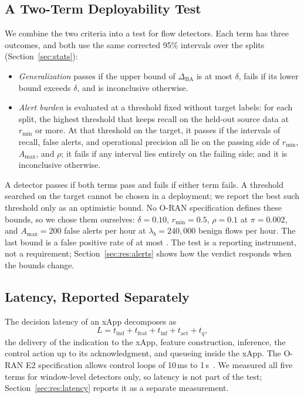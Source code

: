 \subsection{A Two-Term Deployability Test}
\label{sec:crit:test}

We combine the two criteria into a test for flow detectors. Each term has three outcomes, and both use the same corrected 95\% intervals over the splits (Section~\ref{sec:stats}):
\begin{itemize}
\item \emph{Generalization} passes if the upper bound of $\Delta_{\mathrm{BA}}$ is at most $\delta$, fails if its lower bound exceeds $\delta$, and is inconclusive otherwise.
\item \emph{Alert burden} is evaluated at a threshold fixed without target labels: for each split, the highest threshold that keeps recall on the held-out source data at $r_{\min}$ or more. At that threshold on the target, it passes if the intervals of recall, false alerts, and operational precision all lie on the passing side of $r_{\min}$, $A_{\max}$, and $\rho$; it fails if any interval lies entirely on the failing side; and it is inconclusive otherwise.
\end{itemize}
A detector passes if both terms pass and fails if either term fails. A threshold searched on the target cannot be chosen in a deployment; we report the best such threshold only as an optimistic bound. No O-RAN specification defines these bounds, so we chose them ourselves: $\delta = 0.10$, $r_{\min}=0.5$, $\rho = 0.1$ at $\pi = 0.002$, and $A_{\max} = 200$ false alerts per hour at $\lambda_b = 240{,}000$ benign flows per hour. The last bound is a false positive rate of at most \RFPRmax. The test is a reporting instrument, not a requirement; Section~\ref{sec:res:alerts} shows how the verdict responds when the bounds change.

\subsection{Latency, Reported Separately}

The decision latency of an xApp decomposes as
\begin{equation}
L = t_{\mathrm{ind}} + t_{\mathrm{feat}} + t_{\mathrm{inf}} + t_{\mathrm{act}} + t_{q},
\label{eq:latency}
\end{equation}
the delivery of the indication to the xApp, feature construction, inference, the control action up to its acknowledgment, and queueing inside the xApp. The O-RAN E2 specification allows control loops of 10\,ms to 1\,s~\cite{etsi_e2gap}. We measured all five terms for window-level detectors only, so latency is not part of the test; Section~\ref{sec:res:latency} reports it as a separate measurement.

